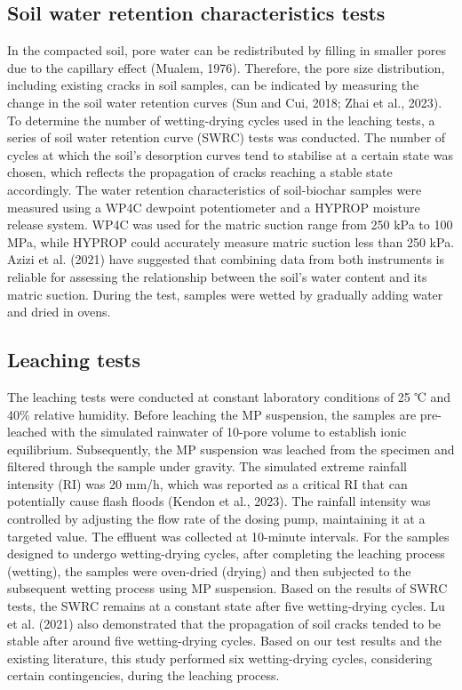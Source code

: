\subsection{Soil water retention characteristics tests}
In the compacted soil, pore water can be redistributed by filling in smaller pores due to the capillary effect (Mualem, 1976). Therefore, the pore size distribution, including existing cracks in soil samples, can be indicated by measuring the change in the soil water retention curves (Sun and Cui, 2018; Zhai et al., 2023). To determine the number of wetting-drying cycles used in the leaching tests, a series of soil water retention curve (SWRC) tests was conducted. The number of cycles at which the soil’s desorption curves tend to stabilise at a certain state was chosen, which reflects the propagation of cracks reaching a stable state accordingly. The water retention characteristics of soil-biochar samples were measured using a WP4C dewpoint potentiometer and a HYPROP moisture release system. WP4C was used for the matric suction range from 250 kPa to 100 MPa, while HYPROP could accurately measure matric suction less than 250 kPa. Azizi et al. (2021) have suggested that combining data from both instruments is reliable for assessing the relationship between the soil’s water content and its matric suction. During the test, samples were wetted by gradually adding water and dried in ovens.\par

\subsection{Leaching tests}
The leaching tests were conducted at constant laboratory conditions of 25 ℃ and 40\% relative humidity. Before leaching the MP suspension, the samples are pre-leached with the simulated rainwater of 10-pore volume to establish ionic equilibrium. Subsequently, the MP suspension was leached from the specimen and filtered through the sample under gravity. The simulated extreme rainfall intensity (RI) was 20 mm/h, which was reported as a critical RI that can potentially cause flash floods (Kendon et al., 2023). The rainfall intensity was controlled by adjusting the flow rate of the dosing pump, maintaining it at a targeted value. The effluent was collected at 10-minute intervals. For the samples designed to undergo wetting-drying cycles, after completing the leaching process (wetting), the samples were oven-dried (drying) and then subjected to the subsequent wetting process using MP suspension. Based on the results of SWRC tests, the SWRC remains at a constant state after five wetting-drying cycles. Lu et al. (2021) also demonstrated that the propagation of soil cracks tended to be stable after around five wetting-drying cycles. Based on our test results and the existing literature, this study performed six wetting-drying cycles, considering certain contingencies, during the leaching process. \par

